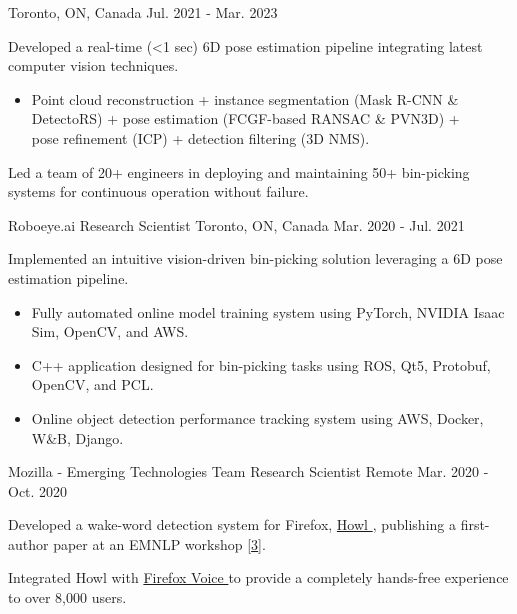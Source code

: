 \begin{cventries}
{Toronto, ON, Canada} %
{Jul. 2021 - Mar. 2023} %
{ %
\begin{cvitems}
\item {Developed a real-time (<1 sec) 6D pose estimation pipeline integrating latest computer vision techniques.}
\begin{itemize}[label=$\cdot$,leftmargin=0.7em]
\item{Point cloud reconstruction + instance segmentation (Mask R-CNN \& DetectoRS) + pose estimation (FCGF-based RANSAC \& PVN3D) + \\
pose refinement (ICP) + detection filtering (3D NMS).}
\end{itemize}
\item {Led a team of 20+ engineers in deploying and maintaining 50+ bin-picking systems for continuous operation without failure.}
\end{cvitems}
}
\cventry
{Roboeye.ai} %
{Research Scientist} %
{Toronto, ON, Canada} %
{Mar. 2020 - Jul. 2021} %
{ %
\begin{cvitems}
\item {Implemented an intuitive vision-driven bin-picking solution leveraging a 6D pose estimation pipeline.}
\begin{itemize}[label=$\cdot$,leftmargin=0.7em]
\item {Fully automated online model training system using PyTorch, NVIDIA Isaac Sim, OpenCV, and AWS.}
\item {C++ application designed for bin-picking tasks using ROS, Qt5, Protobuf, OpenCV, and PCL.}
\item {Online object detection performance tracking system using AWS, Docker, W\&B, Django.}
\end{itemize}
\end{cvitems}
}
\cventry
{Mozilla - Emerging Technologies Team} %
{Research Scientist} %
{Remote} %
{Mar. 2020 - Oct. 2020} %
{ %
\begin{cvitems}
\item {Developed a wake-word detection system for Firefox, \href{https://github.com/castorini/howl}{Howl {\small \faGithub}}, publishing a first-author paper at an EMNLP workshop [\hyperlink{howl:EMNLP}{3}].}
\item {Integrated Howl with \href{https://github.com/mozilla-extensions/firefox-voice}{Firefox Voice {\small \faGithub}} to provide a completely hands-free experience to over 8,000 users.}

\end{cvitems}}
\end{cventries}
